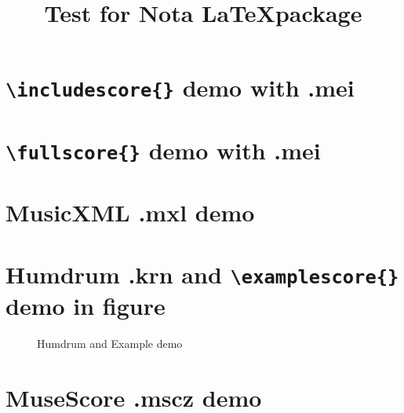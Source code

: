 \documentclass[
    a4paper,
]{article}
\begin{document}
\title{Test for Nota \LaTeX package}
\maketitle

\tableofcontents

\section{\texttt{\textbackslash includescore\{\}} demo with \textbf{.mei}}

    \blindtext[1]


    \blindtext[1]

\section{\texttt{\textbackslash fullscore\{\}} demo with \textbf{.mei}}

    \blindtext[1]


    \blindtext[1]

\section{MusicXML \textbf{.mxl} demo}

    \blindtext[1]


    \blindtext[1]

\section{Humdrum \textbf{.krn} and \texttt{\textbackslash examplescore\{\}} demo in figure}

    \blindtext[1]

    \begin{figure}[h!]
        \centering
        \caption{Humdrum and Example demo}
    \end{figure}

    \blindtext[1]

\section{MuseScore \textbf{.mscz} demo}

    \blindtext[1]


    \blindtext[1]
\end{document}
